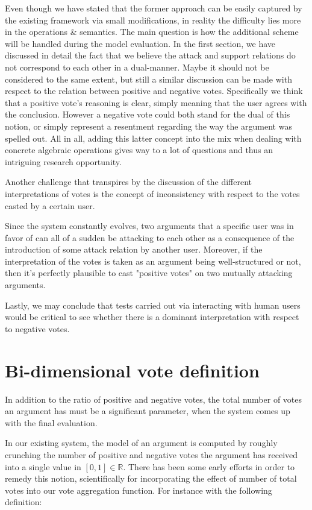\documentclass{article}
\begin{document}
{\color{red}
Even though we have stated that the former approach can be easily captured by the existing framework via small modifications, in reality the difficulty lies more in the operations \& semantics. The main question is how the additional scheme will be handled during the model evaluation. In the first section, we have discussed in detail the fact that we believe the attack and support relations do not correspond to each other in a dual-manner. Maybe it should not be considered to the same extent, but still a similar discussion can be made with respect to the relation between positive and negative votes. Specifically we think that a positive vote's reasoning is clear, simply meaning that the user agrees with the conclusion. However a negative vote could both stand for the dual of this notion, or simply represent a resentment regarding the way the argument was spelled out. All in all, adding this latter concept into the mix when dealing with concrete algebraic operations gives way to a lot of questions and thus an intriguing research opportunity.

Another challenge that transpires by the discussion of the different interpretations of votes is the concept of inconsistency with respect to the votes casted by a certain user. }Since the system constantly evolves, two arguments that a specific user was in favor of can all of a sudden be attacking to each other as a consequence of the introduction of some attack relation by another user. Moreover, if the interpretation of the votes is taken as an argument being well-structured or not, then it's perfectly plausible to cast "positive votes" on two mutually attacking arguments.

Lastly, we may conclude that tests carried out via interacting with human users would be critical to see whether there is a dominant interpretation with respect to negative votes. 



\section{Bi-dimensional vote definition}
In addition to the ratio of positive and negative votes, the total number of votes an argument has must be a significant parameter, when the system comes up with the final evaluation.

 In our existing system, the model of an argument is computed by roughly crunching  the number of positive and negative votes the argument has received into a single value in  $[0,1] \in \mathbb{R}$. There has been some early efforts in order to remedy this notion, scientifically for incorporating the effect of number of total votes into our vote aggregation function. For instance with the following definition:
\end{document}
